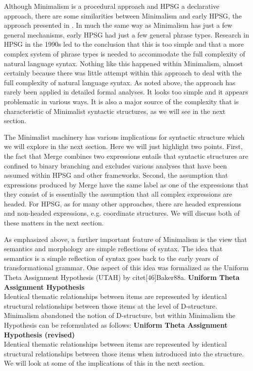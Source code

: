 \documentclass[output=paper]{langsci/langscibook}
\begin{document}
Although Minimalism is a procedural approach and HPSG a declarative approach, there are some similarities between Minimalism and early HPSG, the approach presented in \citet{ps,ps2}. In much the same way as Minimalism has just a few general mechanisms, early HPSG had just a few general phrase types. Research in HPSG in the 1990s led to the conclusion that this is too simple and that a more complex system of phrase types is needed to accommodate the full complexity of natural language syntax. Nothing like this happened within Minimalism, almost certainly because there was little attempt within this approach to deal with the full complexity of natural language syntax. As noted above, the approach has rarely been applied in detailed formal analyses. It looks too simple and it appears problematic in various ways. It is also a major source of the complexity that is characteristic of Minimalist syntactic structures, as we will see in the next section.

The Minimalist machinery has various implications for syntactic structure which we will explore in the next section. Here we will just highlight two points. First, the fact that Merge combines two expressions entails that syntactic structures are confined to binary branching and excludes various analyses that have been assumed within HPSG and other frameworks. Second, the assumption that expressions produced by Merge have the same label as one of the expressions that they consist of is essentially the assumption that all complex expressions are headed. For HPSG, as for many other approaches, there are headed expressions and non-headed expressions, e.g. coordinate structures. We will discuss both of these matters in the next section.

As emphasized above, a further important feature of Minimalism is the view that semantics and morphology are simple reflections of syntax. The idea that semantics is a simple reflection of syntax goes back to the early years of transformational grammar. One aspect of this idea was formalized as the Uniform Theta Assignment Hypothesis (UTAH) by citet[46]{Baker88a}.
\ea\label{ex:min-UTAH}
\textbf{Uniform Theta Assignment Hypothesis}\\
Identical thematic relationships between items are represented by identical structural relationships between those items at the level of D-structure.
\z
Minimalism abandoned the notion of D-structure, but within Minimalism the Hypothesis can be reformulated as follows:
\ea\label{ex:min-UTAH-revised}
\textbf{Uniform Theta Assignment Hypothesis (revised)}\\
Identical thematic relationships between items are represented by identical structural relationships between those items when introduced into the structure.
\z
We will look at some of the implications of this in the next section.
\end{document}
